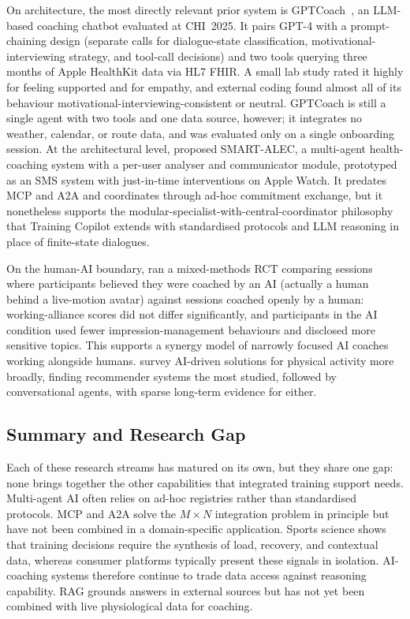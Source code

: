 On architecture, the most directly relevant prior system is GPTCoach~\citep{joerke_gptcoach_2024}, an LLM-based coaching chatbot evaluated at CHI~2025. It pairs GPT-4 with a prompt-chaining design (separate calls for dialogue-state classification, motivational-interviewing strategy, and tool-call decisions) and two tools querying three months of Apple HealthKit data via HL7 FHIR. A small lab study rated it highly for feeling supported and for empathy, and external coding found almost all of its behaviour motivational-interviewing-consistent or neutral. GPTCoach is still a single agent with two tools and one data source, however; it integrates no weather, calendar, or route data, and was evaluated only on a single onboarding session. At the architectural level, \cite{vemuri_multiagent_2021} proposed SMART-ALEC, a multi-agent health-coaching system with a per-user analyser and communicator module, prototyped as an SMS system with just-in-time interventions on Apple Watch. It predates MCP and A2A and coordinates through ad-hoc commitment exchange, but it nonetheless supports the modular-specialist-with-central-coordinator philosophy that Training Copilot extends with standardised protocols and LLM reasoning in place of finite-state dialogues.

On the human-AI boundary, \cite{barger_artificial_2025} ran a mixed-methods RCT comparing sessions where participants believed they were coached by an AI (actually a human behind a live-motion avatar) against sessions coached openly by a human: working-alliance scores did not differ significantly, and participants in the AI condition used fewer impression-management behaviours and disclosed more sensitive topics. This supports a synergy model of narrowly focused AI coaches working alongside humans. \cite{gabarron_human_2024} survey AI-driven solutions for physical activity more broadly, finding recommender systems the most studied, followed by conversational agents, with sparse long-term evidence for either.

\subsection{Summary and Research Gap}\label{sec:sota:summary}

Each of these research streams has matured on its own, but they share one gap: none brings together the other capabilities that integrated training support needs. Multi-agent AI often relies on ad-hoc registries rather than standardised protocols. MCP and A2A solve the $M \times N$ integration problem in principle but have not been combined in a domain-specific application. Sports science shows that training decisions require the synthesis of load, recovery, and contextual data, whereas consumer platforms typically present these signals in isolation. AI-coaching systems therefore continue to trade data access against reasoning capability. RAG grounds answers in external sources but has not yet been combined with live physiological data for coaching.

